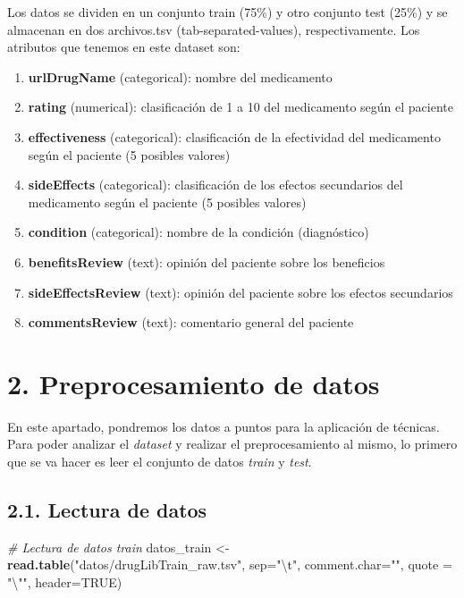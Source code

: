 \documentclass[spanish,]{article}
\newenvironment{Shaded}{\begin{snugshade}}{\end{snugshade}}
\newcommand{\CharTok}[1]{\textcolor[rgb]{0.31,0.60,0.02}{#1}}
\newcommand{\CommentTok}[1]{\textcolor[rgb]{0.56,0.35,0.01}{\textit{#1}}}
\newcommand{\DataTypeTok}[1]{\textcolor[rgb]{0.13,0.29,0.53}{#1}}
\newcommand{\KeywordTok}[1]{\textcolor[rgb]{0.13,0.29,0.53}{\textbf{#1}}}
\newcommand{\NormalTok}[1]{#1}
\newcommand{\OtherTok}[1]{\textcolor[rgb]{0.56,0.35,0.01}{#1}}
\newcommand{\StringTok}[1]{\textcolor[rgb]{0.31,0.60,0.02}{#1}}
\providecommand{\tightlist}{%
  \setlength{\itemsep}{0pt}\setlength{\parskip}{0pt}}
\begin{document}
Los datos se dividen en un conjunto train (75\%) y otro conjunto test
(25\%) y se almacenan en dos archivos.tsv (tab-separated-values),
respectivamente. Los atributos que tenemos en este dataset son:

\begin{enumerate}
\def\labelenumi{\arabic{enumi}.}
\tightlist
\item
  \textbf{urlDrugName} (categorical): nombre del medicamento
\item
  \textbf{rating} (numerical): clasificación de 1 a 10 del medicamento
  según el paciente
\item
  \textbf{effectiveness} (categorical): clasificación de la efectividad
  del medicamento según el paciente (5 posibles valores)
\item
  \textbf{sideEffects} (categorical): clasificación de los efectos
  secundarios del medicamento según el paciente (5 posibles valores)
\item
  \textbf{condition} (categorical): nombre de la condición (diagnóstico)
\item
  \textbf{benefitsReview} (text): opinión del paciente sobre los
  beneficios
\item
  \textbf{sideEffectsReview} (text): opinión del paciente sobre los
  efectos secundarios
\item
  \textbf{commentsReview} (text): comentario general del paciente
\end{enumerate}

\hypertarget{preprocesamiento-de-datos}{%
\section{2. Preprocesamiento de datos}\label{preprocesamiento-de-datos}}

En este apartado, pondremos los datos a puntos para la aplicación de
técnicas. Para poder analizar el \emph{dataset} y realizar el
preprocesamiento al mismo, lo primero que se va hacer es leer el
conjunto de datos \emph{train} y \emph{test}.

\hypertarget{lectura-de-datos}{%
\subsection{2.1. Lectura de datos}\label{lectura-de-datos}}

\begin{Shaded}
\begin{Highlighting}[]
\CommentTok{# Lectura de datos train}
\NormalTok{datos_train <-}\StringTok{ }\KeywordTok{read.table}\NormalTok{(}\StringTok{"datos/drugLibTrain_raw.tsv"}\NormalTok{, }\DataTypeTok{sep=}\StringTok{"}\CharTok{\textbackslash{}t}\StringTok{"}\NormalTok{, }\DataTypeTok{comment.char=}\StringTok{""}\NormalTok{,}
                          \DataTypeTok{quote =} \StringTok{"}\CharTok{\textbackslash{}"}\StringTok{"}\NormalTok{, }\DataTypeTok{header=}\OtherTok{TRUE}\NormalTok{)}
\end{Highlighting}
\end{Shaded}
\end{document}
